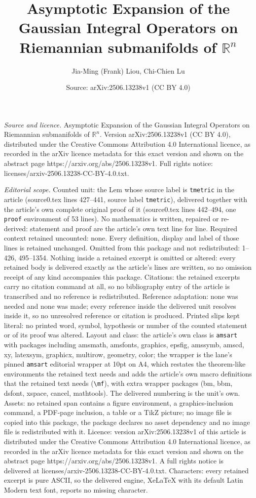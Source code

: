 \documentclass[10pt,a4paper]{amsart}
\title[Asymptotic Expansion of the Gaussian Integral Operators on R]{Asymptotic Expansion of the Gaussian Integral Operators on Riemannian submanifolds of $\mathbb{R}^{n}$}
\author{Jia-Ming (Frank) Liou, Chi-Chien Lu}
\date{Source: arXiv:2506.13238v1 (CC BY 4.0)}
\begin{document}
\maketitle

\noindent\emph{Source and licence.} Asymptotic Expansion of the Gaussian Integral Operators on Riemannian submanifolds of $\mathbb{R}^{n}$. Version arXiv:2506.13238v1 (CC BY 4.0), distributed under the Creative Commons Attribution 4.0 International licence, as recorded in the arXiv licence metadata for this exact version and shown on the abstract page https://arxiv.org/abs/2506.13238v1. Full rights notice: licenses/arxiv-2506.13238-CC-BY-4.0.txt.\par\smallskip

\noindent\textit{Editorial scope.} Counted unit: the Lem whose source label is \texttt{tmetric} in the article (source0.tex lines 427--441, source label \texttt{tmetric}), delivered together with the article's own complete original proof of it (source0.tex lines 442--494, one \texttt{proof} environment of 53 lines). No mathematics is written, repaired or re-derived: statement and proof are the article's own text line for line. Required context retained uncounted: none. Every definition, display and label of those lines is retained unchanged. Omitted from this package and not redistributed: 1--426, 495--1354. Nothing inside a retained excerpt is omitted or altered: every retained body is delivered exactly as the article's lines are written, so no omission receipt of any kind accompanies this package. Citations: the retained excerpts carry no citation command at all, so no bibliography entry of the article is transcribed and no reference is redistributed. Reference adaptation: none was needed and none was made; every reference inside the delivered unit resolves inside it, so no unresolved reference or citation is produced. Printed slips kept literal: no printed word, symbol, hypothesis or number of the counted statement or of its proof was altered. Layout and class: the article's own class is \texttt{amsart} with packages including amsmath, amsfonts, graphics, epsfig, amssymb, amscd, xy, latexsym, graphicx, multirow, geometry, color; the wrapper is the lane's pinned \texttt{amsart} editorial wrapper at 10pt on A4, which restates the theorem-like environments the retained text needs and adds the article's own macro definitions that the retained text needs (\texttt{\textbackslash mf}), with extra wrapper packages (bm, bbm, dsfont, xspace, cancel, mathtools). The delivered numbering is the unit's own. Assets: no retained span contains a figure environment, a graphics-inclusion command, a PDF-page inclusion, a table or a TikZ picture; no image file is copied into this package, the package declares no asset dependency and no image file is redistributed with it. Licence: version arXiv:2506.13238v1 of this article is distributed under the Creative Commons Attribution 4.0 International licence, as recorded in the arXiv licence metadata for this exact version and shown on the abstract page https://arxiv.org/abs/2506.13238v1. A full rights notice is delivered at licenses/arxiv-2506.13238-CC-BY-4.0.txt. Characters: every retained excerpt is pure ASCII, so the delivered engine, XeLaTeX with its default Latin Modern text font, reports no missing character.
\end{document}

